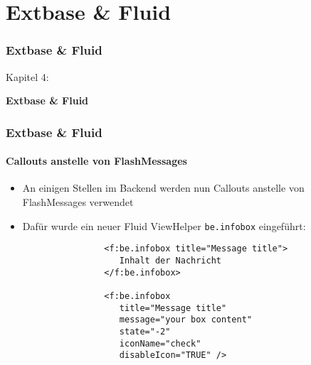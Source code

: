 %

\section{Extbase \& Fluid}
\begin{frame}[fragile]
	\frametitle{Extbase \& Fluid}

	\begin{center}\huge{Kapitel 4:}\end{center}
	\begin{center}\huge{\color{typo3darkgrey}\textbf{Extbase \& Fluid}}\end{center}

\end{frame}


\begin{frame}[fragile]
	\frametitle{Extbase \& Fluid}
	\framesubtitle{Callouts anstelle von FlashMessages}

	\begin{itemize}

		\item An einigen Stellen im Backend werden nun Callouts anstelle von FlashMessages verwendet

		\item Dafür wurde ein neuer Fluid ViewHelper \texttt{be.infobox} eingeführt:

			\begin{lstlisting}
				<f:be.infobox title="Message title">
				   Inhalt der Nachricht
				</f:be.infobox>

				<f:be.infobox
				   title="Message title"
				   message="your box content"
				   state="-2"
				   iconName="check"
				   disableIcon="TRUE" />
			\end{lstlisting}

	\end{itemize}

\end{frame}

